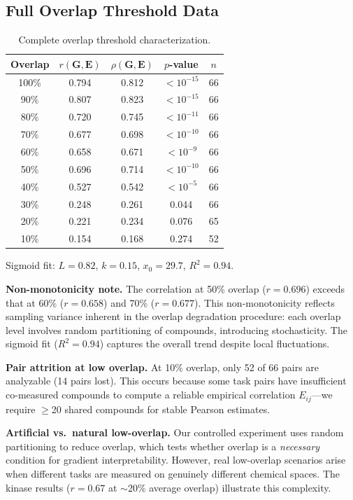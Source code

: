 \documentclass[sigconf,nonacm]{acmart}
\newcommand{\G}{\mathbf{G}}
\newcommand{\E}{\mathbf{E}}
\begin{document}
\subsection{Full Overlap Threshold Data}
\begin{table}[H]
\caption{Complete overlap threshold characterization.}
\begin{center}
\begin{small}
\begin{tabular}{ccccc}
\toprule
Overlap & $r(\G, \E)$ & $\rho(\G, \E)$ & $p$-value & $n$ \\
\midrule
100\% & 0.794 & 0.812 & $<10^{-15}$ & 66 \\
90\% & 0.807 & 0.823 & $<10^{-15}$ & 66 \\
80\% & 0.720 & 0.745 & $<10^{-11}$ & 66 \\
70\% & 0.677 & 0.698 & $<10^{-10}$ & 66 \\
60\% & 0.658 & 0.671 & $<10^{-9}$ & 66 \\
50\% & 0.696 & 0.714 & $<10^{-10}$ & 66 \\
40\% & 0.527 & 0.542 & $<10^{-5}$ & 66 \\
30\% & 0.248 & 0.261 & 0.044 & 66 \\
20\% & 0.221 & 0.234 & 0.076 & 65 \\
10\% & 0.154 & 0.168 & 0.274 & 52 \\
\bottomrule
\end{tabular}
\end{small}
\end{center}
\end{table}

{\small Sigmoid fit: $L = 0.82$, $k = 0.15$, $x_0 = 29.7$, $R^2 = 0.94$.}

\textbf{Non-monotonicity note.} The correlation at 50\% overlap ($r = 0.696$) exceeds that at 60\% ($r = 0.658$) and 70\% ($r = 0.677$). This non-monotonicity reflects sampling variance inherent in the overlap degradation procedure: each overlap level involves random partitioning of compounds, introducing stochasticity. The sigmoid fit ($R^2 = 0.94$) captures the overall trend despite local fluctuations.

\textbf{Pair attrition at low overlap.} At 10\% overlap, only 52 of 66 pairs are analyzable (14 pairs lost). This occurs because some task pairs have insufficient co-measured compounds to compute a reliable empirical correlation $E_{ij}$---we require $\geq$20 shared compounds for stable Pearson estimates.

\textbf{Artificial vs.\ natural low-overlap.} Our controlled experiment uses random partitioning to reduce overlap, which tests whether overlap is a \textit{necessary} condition for gradient interpretability. However, real low-overlap scenarios arise when different tasks are measured on genuinely different chemical spaces. The kinase results ($r=0.67$ at $\sim$20\% average overlap) illustrate this complexity.
\end{document}
